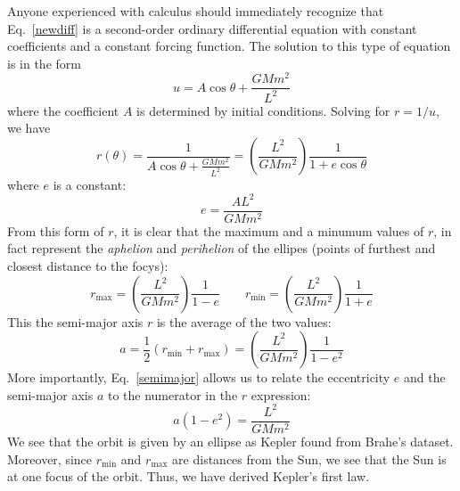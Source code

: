 \documentclass[11pt]{article}
\begin{document}
Anyone experienced with calculus should immediately recognize that
Eq.\ \ref{newdiff} is a second-order ordinary differential equation with
constant coefficients and a constant forcing function. The solution to this
type of equation is in the form
\begin{equation}
  u =A\cos\theta + \frac{GMm^2}{L^2}
\end{equation}
where the coefficient $A$ is determined by initial conditions. Solving for
$r=1/u$, we have
\begin{equation}
  r(\theta)= \frac{1}{A\cos\theta+ \frac{GMm^2}{L^2}}
  =\left(\frac{L^2}{GMm^2}\right)\frac{1}{1+e\cos\theta}
\end{equation}
where $e$ is a constant:
\begin{equation}
  e=\dfrac{AL^2}{GMm^2}
\end{equation}
From this form of $r$, it is clear that the maximum and a minumum values of
$r$, in fact represent the \emph{aphelion} and \emph{perihelion} of the
ellipes (points of furthest and closest distance to the focys):
\begin{equation}
  r_{\textrm{max}}=\left(\frac{L^2}{GMm^2}\right)\frac{1}{1-e}
  \quad\quad
  r_{\textrm{min}}=\left(\frac{L^2}{GMm^2}\right)\frac{1}{1+e}
\end{equation}
This the semi-major axis $r$ is the average of the two values:
\begin{equation}
  a=\dfrac12\left(r_\text{min} + r_\text{max}\right)=
  \left(\frac{L^2}{GMm^2}\right)\frac{1}{1-e^2}
  \label{semimajor}
\end{equation}
More importantly, Eq.\ \ref{semimajor} allows us to relate the eccentricity
$e$ and the semi-major axis $a$ to the numerator in the $r$ expression:
\begin{equation}
  a(1-e^2)=\frac{L^2}{GMm^2}
  \label{eq:numerator}
\end{equation}
We see that the orbit is given by an ellipse as Kepler found from Brahe's
dataset. Moreover, since $r_\mathrm{min}$ and $r_\mathrm{max}$ are distances from
the Sun, we see that the Sun is at one focus of the orbit. Thus, we have
derived Kepler's first law.

%
\end{document}
